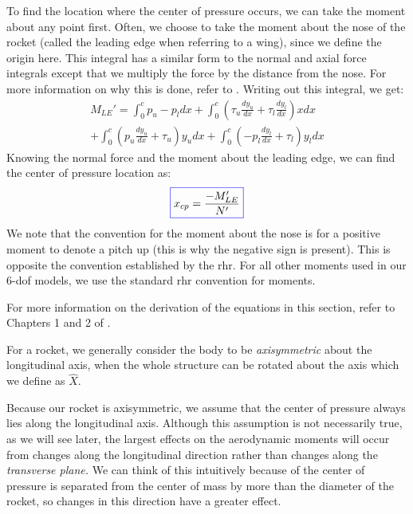 \documentclass[12pt]{report}
\begin{document}
To find the location where the center of pressure occurs, we can take the moment about any point first. Often, we choose to take the moment about the nose of the rocket (called the leading edge when referring to a wing), since we define the origin here. This integral has a similar form to the normal and axial force integrals except that we multiply the force by the distance from the nose. For more information on why this is done, refer to \cite{gundersen_understanding_2020}. Writing out this integral, we get:
\begin{gather}
    M_{LE}'=\int_0^c{p_u-p_l}{dx}+\int_0^c{\left(\tau_u\frac{dy_u}{dx}+\tau_l\frac{dy_l}{dx}\right)}{xdx}\\+\int_0^c{\left(p_u\frac{dy_u}{dx}+\tau_u\right)}{y_udx}+\int_0^c{\left(-p_l\frac{dy_l}{dx}+\tau_l\right)}{y_ldx}
\end{gather}
Knowing the normal force and the moment about the leading edge, we can find the center of pressure location as:
\begin{gather}
    \color{blue}\boxed{\color{black}x_{cp}=\frac{-M_{LE}'}{N'}}
\end{gather}
We note that the convention for the moment about the nose is for a positive moment to denote a pitch up (this is why the negative sign is present). This is opposite the convention established by the \gls{rhr}. For all other moments used in our 6-\gls{dof} models, we use the standard \gls{rhr} convention for moments.

For more information on the derivation of the equations in this section, refer to Chapters 1 and 2 of \cite{anderson_fundamentals_2017}.

For a rocket, we generally consider the body to be \textit{axisymmetric} about the longitudinal axis, when the whole structure can be rotated about the axis which we define as $\hat{X}$. 

Because our rocket is axisymmetric, we assume that the center of pressure always lies along the longitudinal axis. Although this assumption is not necessarily true, as we will see later, the largest effects on the aerodynamic moments will occur from changes along the longitudinal direction rather than changes along the \textit{transverse plane. }We can think of this intuitively because of the center of pressure is separated from the center of mass by more than the diameter of the rocket, so changes in this direction have a greater effect.
\end{document}
